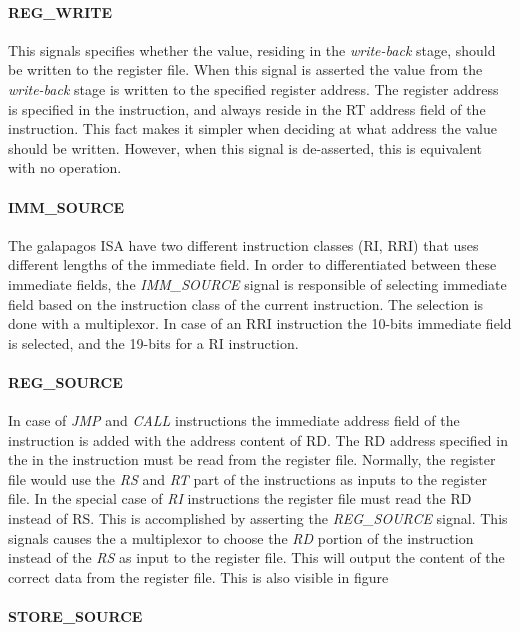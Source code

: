 \paragraph{REG\_WRITE}
This signals specifies whether the value, residing in the \emph{write-back} stage, should be written to the register file. When this signal is asserted the value from the \emph{write-back} stage is written to the specified register address. The register address is specified in the instruction, and always reside in the RT address field of the instruction. This fact makes it simpler when deciding at what address the value should be written. However, when this signal is de-asserted, this is equivalent with no operation. 

\paragraph{IMM\_SOURCE}
The galapagos ISA have two different instruction classes (RI, RRI) that uses different lengths of the immediate field. In order to differentiated between these immediate fields, the \emph{IMM\_SOURCE} signal is responsible of selecting immediate field based on the instruction class of the current instruction. The selection is done with a multiplexor. In case of an RRI instruction the 10-bits immediate field is selected, and the 19-bits for a RI instruction.   


\paragraph{REG\_SOURCE}
In case of \emph{JMP} and \emph{CALL} instructions the immediate address field of the instruction is added with the address content of RD. The RD address specified in the in the instruction must be read from the register file. Normally, the register file would use the \emph{RS} and \emph{RT} part of the instructions as inputs to the register file. In the special case of \emph{RI} instructions the register file must read the RD instead of RS. This is accomplished by asserting the \emph{REG\_SOURCE} signal. This signals causes the a multiplexor to choose the \emph{RD} portion of the instruction instead of the \emph{RS} as input to the register file. This will output the content of the correct data from the register file. This is also visible in figure    


\paragraph{STORE\_SOURCE}





